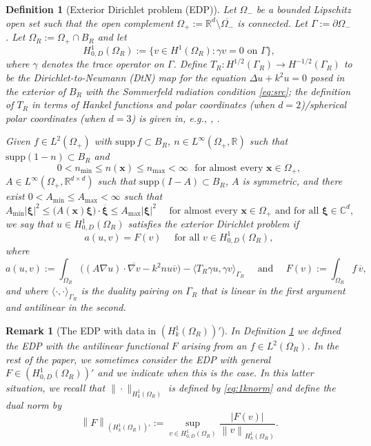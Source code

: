 \documentclass[10pt]{article}%
\newtheorem{definition}[theorem]{Definition}
\newtheorem{remark}[theorem]{Remark}
\numberwithin{equation}{section}
\newcommand{\beq}{\begin{equation}}
\newcommand{\eeq}{\end{equation}}
\newcommand{\bit}{\begin{itemize}}
\newcommand{\eit}{\end{itemize}}
\newcommand{\bre}{\begin{remark}}
\newcommand{\ere}{\end{remark}}
\newcommand{\bx}{\mathbf{x}}
\newcommand{\bxi}{{\boldsymbol{\xi}}}
\newcommand{\supp}{\mathrm{supp}}
\newcommand{\Rea}{\mathbb{R}}
\newcommand{\Com}{\mathbb{C}}
\newcommand{\OR}{{\Omega_R}}
\newcommand{\GR}{{\Gamma_R}}
\newcommand{\gu}{\nabla u}
\newcommand{\gvb}{\overline{\nabla v}}
\newcommand{\vb}{\overline{v}}
\newcommand{\HoDk}{{H^1_{0,D}(\domain_R)}}
\newcommand{\HoDkk}{{H^1_{k}(\domain_R)}}
\newcommand*{\N}[1]{\left\|#1\right\|}
\newcommand{\ton}{\text{ on }}
\newcommand{\tfa}{\text{ for all }}
\newcommand{\tand}{\text{ and }}
\newcommand{\tst}{\text{ such that }}
\newcommand{\varmin}{{n_{\min}}}
\newcommand{\varmax}{{n_{\max}}}
\newcommand{\domain}{\Omega}
\newcommand{\coeffA}{A}
\newcommand{\coeffn}{n}
\begin{document}
\begin{definition}[Exterior Dirichlet problem (EDP)]\label{def:EDP}
Let $\domain_-$ be a bounded Lipschitz open set such that the open complement $\domain_+:= \Rea^d\setminus \overline{\domain_-}$ is connected. Let $\Gamma:= \partial \domain_-$. 
Let $\domain_R:= \domain_+\cap B_R$ and let %
\beq\label{eq:spaceEDP}
H_{0,D}^1(\domain_R):= \big\{ v\in H^1(\domain_R) : \gamma v=0 \ton \Gamma\big\},
\eeq
where $\gamma$ denotes the trace operator on $\Gamma$.
Define $T_R: H^{1/2}(\Gamma_R) \rightarrow H^{-1/2}(\Gamma_R)$ to be the Dirichlet-to-Neumann (DtN) map for the equation $\Delta u+k^2 u=0$ posed in the exterior of $B_R$ with the Sommerfeld radiation condition \eqref{eq:src}; the definition of $T_R$ in terms of Hankel functions and polar coordinates (when $d=2$)/spherical polar coordinates (when $d=3$) is given in, e.g., \cite[Equations 3.5 and 3.6]{ChMo:08} \cite[\S2.6.3]{Ne:01}, \cite[Equations 3.7 and 3.10]{MeSa:10}.

Given 
$f\in L^2(\domain_+)$ with $\supp\, f\subset B_R$,
$\coeffn\in L^\infty(\domain_+,\Rea)$ such that $\supp(1-n)\subset B_R$ and 
\beq\label{eq:nlimitsEDP}
0<\varmin \leq \coeffn(\bx)\leq\varmax<\infty\,\, \text{ for almost every } \bx \in \domain_+,
\eeq
$\coeffA \in L^\infty (\domain_+ , \Rea^{d\times d})$ such that $\supp(I -\coeffA)\subset B_R$, $\coeffA$ is symmetric, and there exist $0<\coeffA_{\min}\leq \coeffA_{\max}<\infty$ such that
\beq\label{eq:AellEDP}
 \coeffA_{\min} |\bxi|^2\leq\big(\coeffA(\bx) \bxi\big) \cdot\overline{ \bxi}  \leq \coeffA_{\max}|\bxi|^2 \quad\text{ for almost every }\bx \in \domain_+ \text{ and for all } \bxi\in \Com^d,
\eeq
we say that $u \in H^1_{0,D}(\domain_R)$ satisfies the \emph{exterior Dirichlet problem} if 
\beq\label{eq:EDPvar}
a(u,v)=F(v) \quad \tfa v\in H^1_{0,D}(\domain_R),
\eeq
where
\beq\label{eq:EDPa}
a(u,v):= \int_{\domain_R} 
\Big((\coeffA \gu)\cdot\gvb
 - k^2 \coeffn u\vb\Big) - \big\langle T_R \gamma u,\gamma v\big\rangle_{\Gamma_R}\quad\tand\quad
F(v):= \int_{\domain_R} f\, \vb,
\eeq
and where $\langle\cdot,\cdot\rangle_{\GR}$ is the duality pairing on $\GR$ that is linear in the first argument and antilinear in the second.
\end{definition}

\bre[The EDP with data in $(\HoDkk)'$]
In Definition \ref{def:EDP} we defined the EDP with the antilinear functional $F$ arising from an $f\in L^2(\OR)$. In the rest of the paper, 
we sometimes consider the EDP with general $F\in (\HoDk)'$ and we indicate when this is the case.
In this latter situation, we recall that $\|\cdot\|_{\HoDkk}$ is defined by \eqref{eq:1knorm} and define the dual norm by
\beq\label{eq:dualnorm}
\N{F}_{(\HoDkk)'}:= \sup_{v\in \HoDk} \frac{|F(v)|}{\N{v}_{\HoDkk}}.
\eeq
\ere
\end{document}
